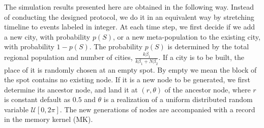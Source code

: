\documentclass[aps,prl]{revtex4-2}
\begin{document}
The simulation results presented here are obtained in the following way. Instead of conducting the designed protocol, we do it in an equivalent way by stretching timeline to events labeled in integer. At each time step, we first decide if we add a new city, with probability $p(S)$, or a new meta-population to the existing city, with probability $1-p(S)$. The probability $p(S)$ is determined by the total regional population and number of cities, $\frac{k\beta_1}{k\beta_1+N\beta_2}$. If a city is to be built, the place of it is randomly chosen at an empty spot. By empty we mean the block of the spot contains no existing node. If it is a new node to be generated, we first determine its ancestor node, and land it at $(r,\theta)$ of the ancestor node, where $r$ is constant default as $0.5$ and $\theta$ is a realization of a uniform distributed random variable $\mathcal{U}[0,2\pi]$. The new generations of nodes are accompanied with a record in the memory kernel (MK).



% 

    
\end{document}
